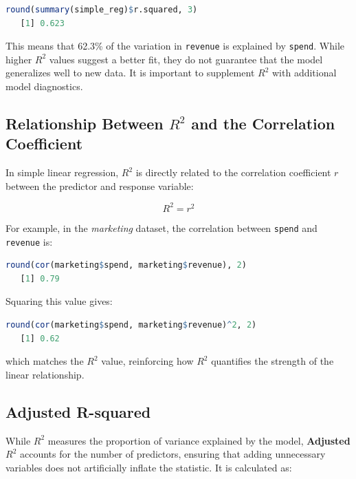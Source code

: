 \documentclass[
  11pt,
]{book}
\newcommand{\passthrough}[1]{#1}
\theoremstyle{definition}
\theoremstyle{definition}
\theoremstyle{definition}
\theoremstyle{definition}
\theoremstyle{remark}
\begin{document}
\begin{lstlisting}[language=R]
round(summary(simple_reg)$r.squared, 3)
   [1] 0.623
\end{lstlisting}

This means that 62.3\% of the variation in \passthrough{\lstinline!revenue!} is explained by \passthrough{\lstinline!spend!}. While higher \(R^2\) values suggest a better fit, they do not guarantee that the model generalizes well to new data. It is important to supplement \(R^2\) with additional model diagnostics.

\subsection*{\texorpdfstring{Relationship Between \(R^2\) and the Correlation Coefficient}{Relationship Between R\^{}2 and the Correlation Coefficient}}\label{relationship-between-r2-and-the-correlation-coefficient}


In simple linear regression, \(R^2\) is directly related to the correlation coefficient \(r\) between the predictor and response variable:

\[
R^2 = r^2
\]

For example, in the \emph{marketing} dataset, the correlation between \passthrough{\lstinline!spend!} and \passthrough{\lstinline!revenue!} is:

\begin{lstlisting}[language=R]
round(cor(marketing$spend, marketing$revenue), 2)
   [1] 0.79
\end{lstlisting}

Squaring this value gives:

\begin{lstlisting}[language=R]
round(cor(marketing$spend, marketing$revenue)^2, 2)
   [1] 0.62
\end{lstlisting}

which matches the \(R^2\) value, reinforcing how \(R^2\) quantifies the strength of the linear relationship.

\subsection*{Adjusted R-squared}\label{adjusted-r-squared}


While \(R^2\) measures the proportion of variance explained by the model, \textbf{Adjusted \(R^2\)} accounts for the number of predictors, ensuring that adding unnecessary variables does not artificially inflate the statistic. It is calculated as:
\end{document}
